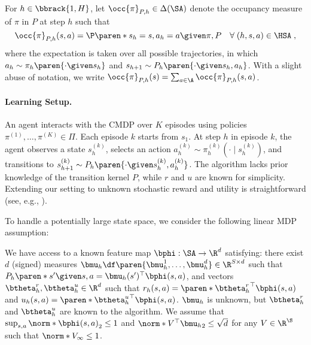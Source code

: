 For $h \in \bbrack{1, H}$, let $\occ{\pi}_{P, h}\in \Delta(\SA)$ denote the occupancy measure of $\pi$ in $P$ at step $h$ such that
\begin{equation}\label{eq:occupancy measure}
\occ{\pi}_{P, h}(s, a) = \P\paren*{s_h=s, a_h=a \given \pi, P}\quad \forall\; (h, s, a) \in \HSA\;,
\end{equation}
where the expectation is taken over all possible trajectories, in which $a_h \sim \pi_h \paren{\cdot \given s_h}$ and $s_{h+1} \sim P_h \paren{\cdot \given s_h, a_h}$.
With a slight abuse of notation, we write $\occ{\pi}_{P, h}(s) = \sum_{a \in \A} \occ{\pi}_{P, h}(s, a)$.

\paragraph{Learning Setup.}
An agent interacts with the CMDP over $K$ episodes using policies $\pi^{(1)}, \dots, \pi^{(K)} \in \Pi$. 
Each episode $k$ starts from $s_1$.
At step $h$ in episode $k$, the agent observes a state $s_h^{(k)}$, selects an action $a_h^{(k)} \sim \pi^{(k)}_h(\cdot\mid s_h^{(k)})$, and transitions to $s_{h+1}^{(k)} \sim P_h\paren{\cdot\given s_h^{(k)}, a_h^{(k)}}$.
The algorithm lacks prior knowledge of the transition kernel $P$, while $r$ and $u$ are known for simplicity. 
Extending our setting to unknown stochastic reward and utility is straightforward (see, e.g., \citet{efroni2020exploration}).

To handle a potentially large state space, we consider the following linear MDP assumption:
\begin{assumption}
\label{assumption:linear mdp}
We have access to a known feature map $\bphi: \SA \to \R^d$ satisfying:
there exist $d$ (signed) measures
$\bmu_h \df \paren{\bmu^1_h, \ldots, \bmu_h^d} \in \R^{S\times d}$ such that
\(P_h \paren*{s' \given s, a} = \bmu_h(s')^\top \bphi (s, a)\), and vectors $\btheta_h^r, \btheta_h^u \in \R^d$ such that 
$r_h(s, a) = \paren*{\btheta_h^r}^\top \bphi(s, a)$ and $u_h(s, a) = \paren*{\btheta_h^u}^\top \bphi(s, a)$.
$\bmu_h$ is unknown, but $\btheta^r_h$ and $\btheta^u_h$ are known to the algorithm.
We assume that $\sup_{s, a}\norm*{\bphi(s, a)}_2 \leq 1$ 
and $\norm*{V^\top \bmu_h}_2 \leq \sqrt{d}$ for any $V \in \R^\S$ such that $\norm*{V}_\infty \leq 1$.
\end{assumption}

